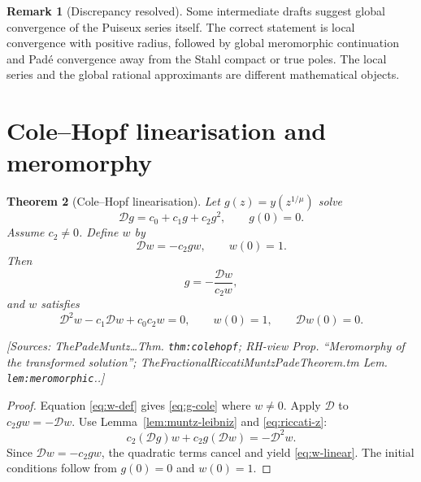 \documentclass[11pt]{article}
\newtheorem{theorem}{Theorem}[section]
\theoremstyle{definition}
\newtheorem{remark}[theorem]{Remark}
\newcommand{\Dc}{\mathcal{D}}
\newcommand{\Source}[1]{\par\smallskip\noindent\textup{[Sources: #1.]}}
\begin{document}
\begin{remark}[Discrepancy resolved]
Some intermediate drafts suggest global convergence of the Puiseux series itself.
The correct statement is local convergence with positive radius,
followed by global meromorphic continuation and Padé convergence away from the Stahl compact or true poles.
The local series and the global rational approximants are different mathematical objects.
\end{remark}

\section{Cole--Hopf linearisation and meromorphy}

\begin{theorem}[Cole--Hopf linearisation]\label{thm:cole-hopf}
Let $g(z)=y(z^{1/\mu})$ solve
\begin{equation}\label{eq:riccati-z}
        \Dc g=c_0+c_1g+c_2g^2,
        \qquad g(0)=0.
\end{equation}
Assume $c_2\ne0$.
Define $w$ by
\begin{equation}\label{eq:w-def}
        \Dc w=-c_2gw,
        \qquad w(0)=1.
\end{equation}
Then
\begin{equation}\label{eq:g-cole}
        g=-\frac{\Dc w}{c_2w},
\end{equation}
and $w$ satisfies
\begin{equation}\label{eq:w-linear}
        \Dc^2w-c_1\Dc w+c_0c_2w=0,
        \qquad w(0)=1,
        \qquad \Dc w(0)=0.
\end{equation}
\Source{ThePadeMuntz\ldots Thm. \texttt{thm:colehopf}; RH-view Prop. ``Meromorphy of the transformed solution''; TheFractionalRiccatiMuntzPadeTheorem.tm Lem. \texttt{lem:meromorphic}.}
\end{theorem}

\begin{proof}
Equation \eqref{eq:w-def} gives \eqref{eq:g-cole} where $w\ne0$.
Apply $\Dc$ to $c_2gw=-\Dc w$.
Use Lemma~\ref{lem:muntz-leibniz} and \eqref{eq:riccati-z}:
\[
        c_2(\Dc g)w+c_2g(\Dc w)=-\Dc^2w.
\]
Since $\Dc w=-c_2gw$,
the quadratic terms cancel and yield \eqref{eq:w-linear}.
The initial conditions follow from $g(0)=0$ and $w(0)=1$.
\end{proof}
\end{document}
